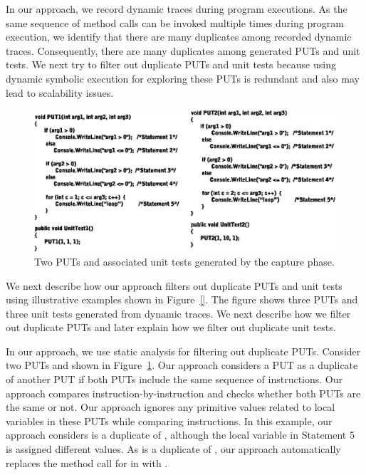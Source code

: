 In our approach, we record dynamic traces during program executions. As the same
sequence of method calls can be invoked multiple times during program execution,
we identify that there are many duplicates among recorded dynamic traces.
Consequently, there are many duplicates among generated PUTs and unit tests. 
We next try to filter out duplicate PUTs and unit tests because using
dynamic symbolic execution for exploring these PUTs is redundant and also
may lead to scalability issues.

\begin{figure}[t]
\centering
\includegraphics[scale=0.75,clip]{figs/PUTsAndUT1.eps}\vspace*{-1ex}
\caption{Two PUTs and associated unit tests generated by the capture phase.} \label{fig:samplePutAndUT}
\end{figure}

We next describe how our approach filters out duplicate PUTs and unit tests using
illustrative examples shown in Figure~\ref{}. The figure shows three PUTs
and three unit tests generated from dynamic traces. We next describe how we filter
out duplicate PUTs and later explain how we filter out duplicate unit tests.

In our approach, we use static analysis for filtering out duplicate PUTs.
Consider two PUTs  and  shown in Figure~\ref{fig:samplePutAndUT}.
Our approach considers a PUT as a duplicate of another PUT if both PUTs include
the same sequence of instructions. Our approach compares instruction-by-instruction and checks whether both PUTs
are the same or not. Our approach ignores any primitive values related to local
variables in these PUTs while comparing instructions. 
In this example, our approach considers  is a duplicate of ,
although the local variable  in Statement 5 is assigned different values.
As  is a duplicate of , our approach automatically replaces
the method call for  in  with .

